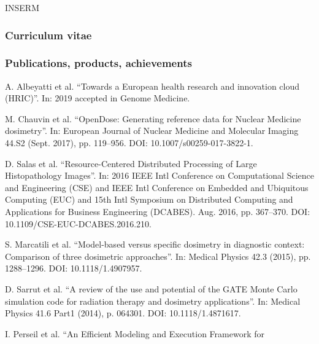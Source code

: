 \begin{sitedescription}{INSERM}
\subsubsection*{Curriculum vitae}






\subsubsection*{Publications, products, achievements}
\begin{compactenum}
\item A. Albeyatti et al. “Towards a European health research and innovation
  cloud (HRIC)”. In: 2019 accepted in Genome Medicine.
\item M. Chauvin et al. “OpenDose: Generating reference data for Nuclear
  Medicine dosimetry”. In: European Journal of Nuclear Medicine and Molecular
  Imaging 44.S2 (Sept. 2017), pp. 119--956. DOI: 10.1007/s00259-017-3822-1.
\item D. Salas et al. “Resource-Centered Distributed Processing of Large
  Histopathology Images”. In: 2016 IEEE Intl Conference on Computational
  Science and Engineering (CSE) and IEEE Intl Conference on Embedded and
  Ubiquitous Computing (EUC) and 15th Intl Symposium on Distributed Computing
  and Applications for Business Engineering (DCABES). Aug. 2016, pp. 367--370.
  DOI: 10.1109/CSE-EUC-DCABES.2016.210.
\item S. Marcatili et al. “Model-based versus specific dosimetry in diagnostic
  context: Comparison of three dosimetric approaches”. In: Medical Physics 42.3
  (2015), pp. 1288--1296. DOI: 10.1118/1.4907957.
\item D. Sarrut et al. “A review of the use and potential of the GATE Monte
  Carlo simulation code for radiation therapy and dosimetry applications”. In:
  Medical Physics 41.6 Part1 (2014), p. 064301. DOI: 10.1118/1.4871617.
\item I. Perseil et al. “An Efficient Modeling and Execution Framework for

\end{compactenum}
\end{sitedescription}
